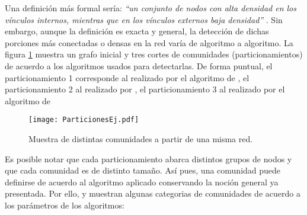 \documentclass[12pt,letter]{article}
\begin{document}
\vspace{0.5cm}


Una definición más formal sería: {\it ``un conjunto de nodos con alta densidad en los vínculos internos, mientras que en los vínculos externos baja densidad''} \citep{Lancichinetti}. Sin embargo, aunque la definición es exacta y general, la detección de dichas porciones más conectadas o densas en la red varía de algoritmo a algoritmo. La figura \ref{Grup2} muestra un grafo inicial y tres cortes de comunidades (particionamientos) de acuerdo a los algoritmos usados para detectarlas. De forma puntual, el particionamiento 1 corresponde al realizado por el algoritmo de \citep{Pons}, el particionamiento 2 al realizado por \citep{Girvan1, Girvan2}, el particionamiento 3 al realizado por el algoritmo de \citep{Blondel}

\vspace{0.5cm}

\begin{figure}[h!]
\centering
\texttt{[image: ParticionesEj.pdf]}
\caption{\small{Muestra de distintas comunidades a partir de una misma red.}} \label{Grup2}
\end{figure}

\vspace{0.5cm}

Es posible notar que cada particionamiento abarca distintos grupos de nodos y que cada comunidad es de distinto tamaño. Así pues, una comunidad puede definirse de acuerdo al algoritmo aplicado conservando la noción general ya presentada. Por ello, \cite{Labatut} y \cite{Orman} muestran algunas categorias de comunidades de acuerdo a los parámetros de los algoritmos:
\end{document}
